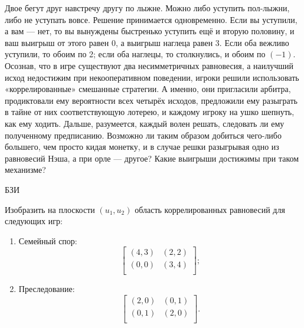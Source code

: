 \begin{problem}[Лыжники-2]
\begin{source}
\cite{savva:nmu}
\end{source} Двое бегут друг навстречу другу по лыжне. Можно либо уступить пол-лыжни, либо не уступать вовсе. Решение принимается одновременно. Если вы уступили, а вам — нет, то вы вынуждены
быстренько уступить ещё и вторую половину, и ваш выигрыш от этого равен 0, а выигрыш наглеца равен 3. Если оба вежливо уступили, то обоим по 2; если оба наглецы, то столкнулись, и обоим по $(-1)$.
Осознав, что в игре существуют два несимметричных равновесия, а наилучший исход недостижим при некооперативном поведении, игроки решили использовать «коррелированные» смешанные стратегии. А именно, они пригласили арбитра, продиктовали ему вероятности всех четырёх исходов, предложили ему разыграть в тайне от них соответствующую лотерею, и каждому игроку на ушко шепнуть, как ему ходить. Дальше, разумеется, каждый волен решать, следовать ли ему полученному предписанию.
Возможно ли таким образом добиться чего-либо большего, чем просто кидая монетку, и в случае решки разыгрывая одно из равновесий Нэша, а при орле — другое? Какие выигрыши достижимы при таком механизме?
\begin{sol}

\end{sol}
\end{problem}

\begin{problem}
\begin{source}
БЗИ
\end{source}
Изобразить на плоскости $(u_1,u_2)$ область коррелированных
равновесий для следующих игр:

\begin{enumerate}

\item Семейный спор:
\[\left[\begin{array}{ll}
(4,3)&(2,2)\\ (0,0)&(3,4)\\
\end{array}\right];\]

\item Преследование:
\[\left[\begin{array}{ll}
(2,0)&(0,1)\\ (0,1)&(2,0)\\
\end{array}\right].\]

\end{enumerate}




\begin{sol}

\end{sol}
\end{problem}







